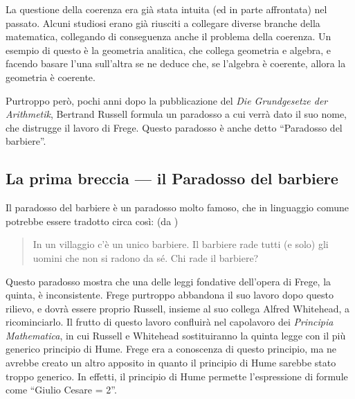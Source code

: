 \documentclass[a4paper,10pt]{article}
\begin{document}
La questione della coerenza era già stata intuita (ed in parte affrontata) nel passato. Alcuni studiosi erano già riusciti a collegare diverse branche della matematica, collegando di conseguenza anche il problema della coerenza. Un esempio di questo è la geometria analitica, che collega geometria e algebra, e facendo basare l'una sull'altra se ne deduce che, se l'algebra è coerente, allora la geometria è coerente.

Purtroppo però, pochi anni dopo la pubblicazione del \textit{Die Grundgesetze der Arithmetik}, Bertrand Russell formula un paradosso a cui verrà dato il suo nome, che distrugge il lavoro di Frege. Questo paradosso è anche detto “Paradosso del barbiere”.

\subsection{La prima breccia --- il Paradosso del barbiere}
Il paradosso del barbiere è un paradosso molto famoso, che in linguaggio comune potrebbe essere tradotto circa così: (da \cite{wp-paradosso-russel-it})
\begin{quotation}
In un villaggio c'è un unico barbiere. Il barbiere rade tutti (e solo) gli uomini che non si radono da sé. Chi rade il barbiere?                                                                                                                                                                                                                                           \end{quotation} 
Questo paradosso mostra che una delle leggi fondative dell'opera di Frege, la quinta, è inconsistente. Frege purtroppo abbandona il suo lavoro dopo questo rilievo, e dovrà essere proprio Russell, insieme al suo collega Alfred Whitehead, a ricominciarlo. Il frutto di questo lavoro confluirà nel capolavoro dei \textit{Principia Mathematica}, in cui Russell e Whitehead sostituiranno la quinta legge con il più generico principio di Hume. Frege era a conoscenza di questo principio, ma ne avrebbe creato un altro apposito in quanto il principio di Hume sarebbe stato troppo generico. In effetti, il principio di Hume permette l'espressione di formule come \textquotedblleft Giulio Cesare = 2\textquotedblright.
\end{document}
